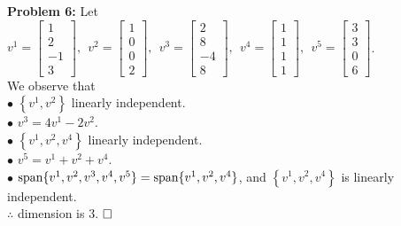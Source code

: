 \documentclass[letterpaper]{article}
\begin{document}
\noindent \textbf{Problem 6:} Let $v^1=\begin{bmatrix} 1\\2\\-1\\3 \end{bmatrix}, ~~ v^2=\begin{bmatrix} 1\\0\\0\\2 \end{bmatrix}, ~~ v^3=\begin{bmatrix} 2\\8\\-4\\8 \end{bmatrix}, ~~ v^4=\begin{bmatrix} 1\\1\\1\\1 \end{bmatrix}, ~~ v^5=\begin{bmatrix} 3\\3\\0\\6 \end{bmatrix}$.\\
We observe that
\medskip\\
$\bullet$ $\left\lbrace v^1, v^2 \right\rbrace$ linearly independent.
\medskip\\
$\bullet$ $v^3=4v^1-2v^2$.
\medskip\\
$\bullet$ $\left\lbrace v^1, v^2, v^4\right\rbrace$ linearly independent.
\medskip\\
$\bullet$ $v^5=v^1+v^2+v^4$.
\medskip\\
$\bullet$ $\textrm{span} \{ v^1, v^2, v^3, v^4, v^5 \} = \textrm{span} \{ v^1, v^2, v^4 \}$, and $\left\lbrace v^1, v^2, v^4\right\rbrace$ is linearly independent.
\medskip\\
$\therefore$ dimension is 3. $\hfill \square$
\bigskip \\
\end{document}
